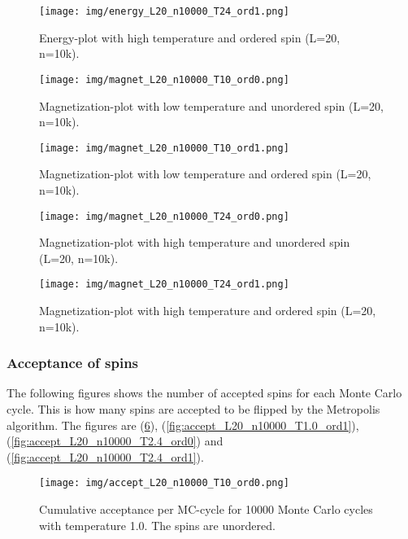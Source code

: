 \documentclass{article}
\begin{document}
    \begin{figure}[ht]
      \centering
      \texttt{[image: img/energy\_L20\_n10000\_T24\_ord1.png]}
      \caption{Energy-plot with high temperature and ordered spin (L=20, n=10k).}
      \label{fig:L20-energy-highT-ord1}
    \end{figure}

    \begin{figure}[ht]
      \centering
      \texttt{[image: img/magnet\_L20\_n10000\_T10\_ord0.png]}
      \caption{Magnetization-plot with low temperature and unordered spin (L=20, n=10k).}
      \label{fig:L20-magnet-lowT-ord0}
    \end{figure}

    \begin{figure}[ht]
      \centering
      \texttt{[image: img/magnet\_L20\_n10000\_T10\_ord1.png]}
      \caption{Magnetization-plot with low temperature and ordered spin (L=20, n=10k).}
      \label{fig:L20-magnet-lowT-ord1}
    \end{figure}

    \begin{figure}[ht]
      \centering
      \texttt{[image: img/magnet\_L20\_n10000\_T24\_ord0.png]}
      \caption{Magnetization-plot with high temperature and unordered spin (L=20, n=10k).}
      \label{fig:L20-magnet-highT-ord0}
    \end{figure}

    \begin{figure}[ht]
      \centering
      \texttt{[image: img/magnet\_L20\_n10000\_T24\_ord1.png]}
      \caption{Magnetization-plot with high temperature and ordered spin (L=20, n=10k).}
      \label{fig:L20-magnet-highT-ord1}
    \end{figure}


\subsubsection{Acceptance of spins} \label{sec:acceptance}

The following figures shows the number of accepted spins for each Monte Carlo cycle. This is how many spins are accepted to be flipped by the Metropolis algorithm. The figures are (\ref{fig:accept_L20_n10000_T1.0_ord0}), (\ref{fig:accept_L20_n10000_T1.0_ord1}), (\ref{fig:accept_L20_n10000_T2.4_ord0}) and (\ref{fig:accept_L20_n10000_T2.4_ord1}). \\

  \begin{figure}[ht]
      \centering
      \texttt{[image: img/accept\_L20\_n10000\_T10\_ord0.png]}
      \caption{Cumulative acceptance per MC-cycle for 10000 Monte Carlo cycles with temperature 1.0. The spins are unordered. }
      \label{fig:accept_L20_n10000_T1.0_ord0}
    \end{figure}
\end{document}
